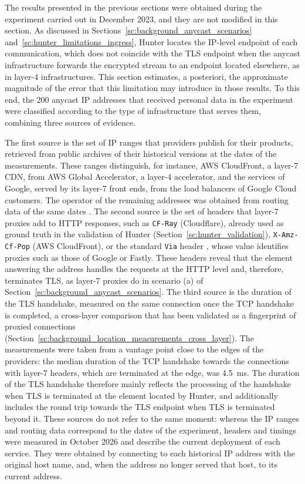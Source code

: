 The results presented in the previous sections were obtained during the experiment carried out in December 2023, and they are not modified in this section. As discussed in Sections~\ref{sc:background_anycast_scenarios} and~\ref{sc:hunter_limitations_ingress}, Hunter locates the IP-level endpoint of each communication, which does not coincide with the TLS endpoint when the anycast infrastructure forwards the encrypted stream to an endpoint located elsewhere, as in layer-4 infrastructures. This section estimates, a posteriori, the approximate magnitude of the error that this limitation may introduce in those results. To this end, the 200 anycast IP addresses that received personal data in the experiment were classified according to the type of infrastructure that serves them, combining three sources of evidence.

The first source is the set of IP ranges that providers publish for their products, retrieved from public archives of their historical versions at the dates of the measurements. These ranges distinguish, for instance, AWS CloudFront, a layer-7 CDN, from AWS Global Accelerator, a layer-4 accelerator, and the services of Google, served by its layer-7 front ends, from the load balancers of Google Cloud customers. The operator of the remaining addresses was obtained from routing data of the same dates \cite{RouteViewsProject}. The second source is the set of headers that layer-7 proxies add to HTTP responses, such as \texttt{CF-Ray} (Cloudflare), already used as ground truth in the validation of Hunter (Section~\ref{sc:hunter_validation}), \texttt{X-Amz-Cf-Pop} (AWS CloudFront), or the standard \texttt{Via} header \cite{Fielding2022HTTPSemantics}, whose value identifies proxies such as those of Google or Fastly. These headers reveal that the element answering the address handles the requests at the HTTP level and, therefore, terminates TLS, as layer-7 proxies do in scenario (a) of Section~\ref{sc:background_anycast_scenarios}. The third source is the duration of the TLS handshake, measured on the same connection once the TCP handshake is completed, a cross-layer comparison that has been validated as a fingerprint of proxied connections (Section~\ref{sc:background_location_measurements_cross_layer}). The measurements were taken from a vantage point close to the edges of the providers: the median duration of the TCP handshake towards the connections with layer-7 headers, which are terminated at the edge, was 4.5~ms. The duration of the TLS handshake therefore mainly reflects the processing of the handshake when TLS is terminated at the element located by Hunter, and additionally includes the round trip towards the TLS endpoint when TLS is terminated beyond it. These sources do not refer to the same moment: whereas the IP ranges and routing data correspond to the dates of the experiment, headers and timings were measured in October 2026 and describe the current deployment of each service. They were obtained by connecting to each historical IP address with the original host name, and, when the address no longer served that host, to its current address.

